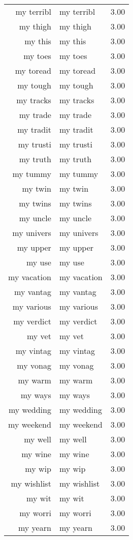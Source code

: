\begin{table}[ht]
\begin{tabular}{rlr}
  my terribl & my terribl & 3.00 \\ 
  my thigh & my thigh & 3.00 \\ 
  my this & my this & 3.00 \\ 
  my toes & my toes & 3.00 \\ 
  my toread & my toread & 3.00 \\ 
  my tough & my tough & 3.00 \\ 
  my tracks & my tracks & 3.00 \\ 
  my trade & my trade & 3.00 \\ 
  my tradit & my tradit & 3.00 \\ 
  my trusti & my trusti & 3.00 \\ 
  my truth & my truth & 3.00 \\ 
  my tummy & my tummy & 3.00 \\ 
  my twin & my twin & 3.00 \\ 
  my twins & my twins & 3.00 \\ 
  my uncle & my uncle & 3.00 \\ 
  my univers & my univers & 3.00 \\ 
  my upper & my upper & 3.00 \\ 
  my use & my use & 3.00 \\ 
  my vacation & my vacation & 3.00 \\ 
  my vantag & my vantag & 3.00 \\ 
  my various & my various & 3.00 \\ 
  my verdict & my verdict & 3.00 \\ 
  my vet & my vet & 3.00 \\ 
  my vintag & my vintag & 3.00 \\ 
  my vonag & my vonag & 3.00 \\ 
  my warm & my warm & 3.00 \\ 
  my ways & my ways & 3.00 \\ 
  my wedding & my wedding & 3.00 \\ 
  my weekend & my weekend & 3.00 \\ 
  my well & my well & 3.00 \\ 
  my wine & my wine & 3.00 \\ 
  my wip & my wip & 3.00 \\ 
  my wishlist & my wishlist & 3.00 \\ 
  my wit & my wit & 3.00 \\ 
  my worri & my worri & 3.00 \\ 
  my yearn & my yearn & 3.00 \\ 

\end{tabular}
\end{table}
